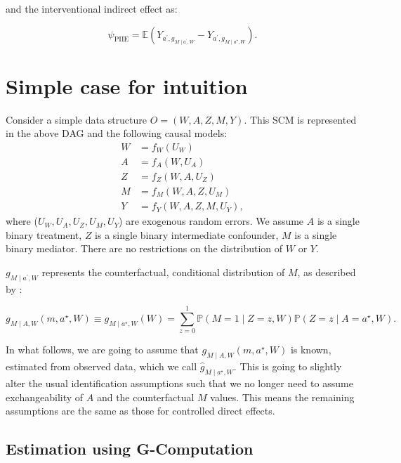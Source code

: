 \documentclass[
  12pt,
]{book}
\theoremstyle{definition}
\theoremstyle{definition}
\theoremstyle{definition}
\renewcommand{\P}{\mathbb{P}}
\newcommand{\E}{\mathbb{E}}
\newcommand{\1}{\mathbbm{1}}
\begin{document}
and the interventional indirect effect as:

\begin{equation*}
  \psi_{\text{PIIE}} = \E(Y_{a^\prime,g_{M \mid a^\prime,W}} -
    Y_{a^\prime,g_{M \mid a^\star,W}}).
\end{equation*}

\hypertarget{simple-case-for-intuition-1}{%
\section{Simple case for intuition}\label{simple-case-for-intuition-1}}

Consider a simple data structure \(O=(W, A, Z, M, Y)\). This SCM is represented in
the above DAG and the following causal models:
\begin{align*}
W & = f_W(U_W)\\
A & = f_A(W, U_A)\\
Z & = f_Z(W, A, U_Z)\\
M & = f_M(W, A, Z, U_M)\\
Y & = f_Y(W, A, Z, M, U_Y),
\end{align*}
where (\(U_W, U_A, U_Z, U_M, U_Y\)) are exogenous random errors. We assume \(A\) is
a single binary treatment, \(Z\) is a single binary intermediate confounder, \(M\)
is a single binary mediator. There are no restrictions on the distribution of
\(W\) or \(Y\).

\(g_{M \mid a^\prime,W}\) represents the counterfactual,
conditional distribution of \(M\), as described by
\citet{vanderweele2016mediation}:

\begin{equation*}
  g_{M \mid A,W}(m, a^{\star}, W) \equiv g_{M \mid a^{\star}, W}(W) =
    \sum_{z=0}^1 \P(M=1 \mid Z=z,W) \P(Z=z \mid A=a^{\star}, W).
\end{equation*}

In what follows, we are going to assume that \(g_{M \mid A,W}(m, a^{\star}, W)\)
is known, estimated from observed data, which we call
\(\hat{g}_{M \mid a^{\star}, W}\). This is going to slightly alter the usual
identification assumptions such that we no longer need to assume exchangeability
of \(A\) and the counterfactual \(M\) values. This means the remaining assumptions
are the same as those for controlled direct effects.

\hypertarget{estimation-using-g-computation}{%
\subsection{Estimation using G-Computation}\label{estimation-using-g-computation}}
\end{document}
